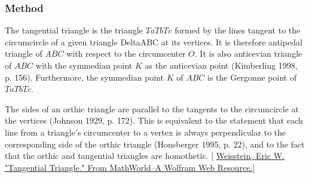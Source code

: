 

\subsubsection{Method } %
\label{ssub:method_imeth_triangle_tangential}

The tangential triangle is the triangle $TaTbTc$ formed by the lines tangent to the circumcircle of a given triangle DeltaABC at its vertices. It is therefore antipedal triangle of $ABC$ with respect to the circumcenter $O$. It is also anticevian triangle of $ABC$ with the symmedian point $K$ as the anticevian point (Kimberling 1998, p. 156). Furthermore, the symmedian point $K$ of $ABC$ is the Gergonne point of $TaTbTc$.

The sides of an orthic triangle are parallel to the tangents to the circumcircle at the vertices (Johnson 1929, p. 172). This is equivalent to the statement that each line from a triangle's circumcenter to a vertex is always perpendicular to the corresponding side of the orthic triangle (Honsberger 1995, p. 22), and to the fact that the orthic and tangential triangles are homothetic.
[ \href{https://mathworld.wolfram.com/TangentialTriangle.html}{Weisstein, Eric W. "Tangential Triangle." From MathWorld--A Wolfram Web Resource.}]


  \begin{center}
  \end{center}
\vspace{6pt}

